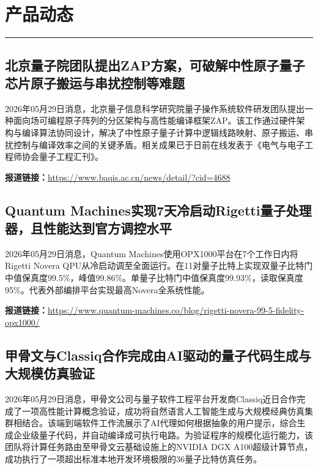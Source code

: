 \documentclass[12pt,a4paper]{ctexart}
\begin{document}
\newpage
\section{产品动态}
\vspace{-0.5em}
\noindent\rule{\linewidth}{1.5pt}

\subsection{ 北京量子院团队提出ZAP方案，可破解中性原子量子芯片原子搬运与串扰控制等难题 }

2026年05月29日消息，北京量子信息科学研究院量子操作系统软件研发团队提出一种面向场可编程原子阵列的分区架构与高性能编译框架ZAP。该工作通过硬件架构与编译算法协同设计，解决了中性原子量子计算中逻辑线路映射、原子搬运、串扰控制与编译效率之间的关键矛盾。相关成果已于日前在线发表于《电气与电子工程师协会量子工程汇刊》。

\noindent\textbf{报道链接：}\url{https://www.baqis.ac.cn/news/detail/?cid=4688}

\subsection{ Quantum Machines实现7天冷启动Rigetti量子处理器，且性能达到官方调控水平 }

2026年05月29日消息，Quantum Machines使用OPX1000平台在7个工作日内将Rigetti Novera QPU从冷启动调至全面运行。在11对量子比特上实现双量子比特门中值保真度99.5\%，峰值99.86\%。单量子比特门中值保真度99.93\%，读取保真度95\%。代表外部编排平台实现最高Novera全系统性能。

\noindent\textbf{报道链接：}\url{https://www.quantum-machines.co/blog/rigetti-novera-99-5-fidelity-opx1000/}

\subsection{ 甲骨文与Classiq合作完成由AI驱动的量子代码生成与大规模仿真验证 }

2026年05月29日消息，甲骨文公司与量子软件工程平台开发商Classiq近日合作完成了一项高性能计算概念验证，成功将自然语言人工智能生成与大规模经典仿真集群相结合。该端到端软件工作流展示了AI代理如何根据抽象的用户提示，综合生成企业级量子代码，并自动编译成可执行电路。为验证程序的规模化运行能力，该团队将计算任务路由至甲骨文云基础设施上的NVIDIA DGX A100超级计算节点，成功执行了一项超出标准本地开发环境极限的36量子比特仿真任务。
\end{document}
